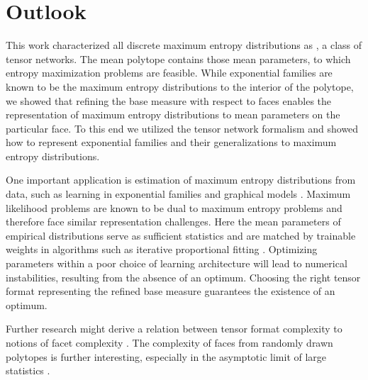 \section{Outlook}

This work characterized all discrete maximum entropy distributions as \ComputationActivationNetworks{}, a class of tensor networks.
The mean polytope contains those mean parameters, to which entropy maximization problems are feasible.
While exponential families are known to be the maximum entropy distributions to the interior of the polytope, we showed that refining the base measure with respect to faces enables the representation of maximum entropy distributions to mean parameters on the particular face.
To this end we utilized the tensor network formalism and showed how to represent exponential families and their generalizations to maximum entropy distributions.

One important application is estimation of maximum entropy distributions from data, such as learning in exponential families and graphical models \cite{jordan_learning_1998}.
Maximum likelihood problems are known to be dual to maximum entropy problems \cite{koller_probabilistic_2009} and therefore face similar representation challenges.
Here the mean parameters of empirical distributions serve as sufficient statistics and are matched by trainable weights in algorithms such as iterative proportional fitting \cite{darroch_generalized_1972,csiszar_geometric_1989}.
Optimizing parameters within a poor choice of learning architecture will lead to numerical instabilities, resulting from the absence of an optimum.
Choosing the right tensor format representing the refined base measure guarantees the existence of an optimum.

Further research might derive a relation between tensor format complexity \cite{hackbusch_tensor_2012} to notions of facet complexity \cite{grotschel_geometric_1993}.
The complexity of faces from randomly drawn polytopes is further interesting, especially in the asymptotic limit of large statistics \cite{vershynin_high-dimensional_2018, wainwright_high-dimensional_2019}.

%
%
%

